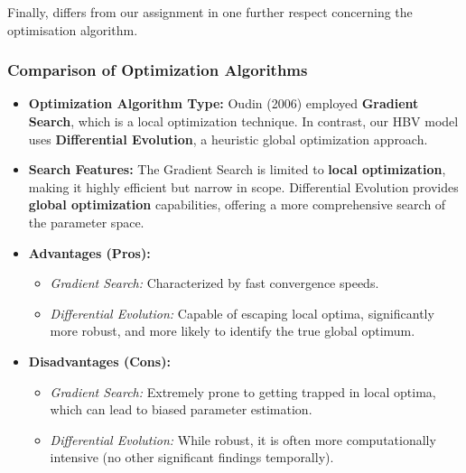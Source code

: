 Finally,\cite{Oudin.2006} differs from our assignment in one further respect concerning the optimisation algorithm.
\subsubsection*{Comparison of Optimization Algorithms}

\begin{itemize}
    \item \textbf{Optimization Algorithm Type:} 
    Oudin (2006) employed \textbf{Gradient Search}, which is a local optimization technique. In contrast, our HBV model uses \textbf{Differential Evolution}, a heuristic global optimization approach.
    
    \item \textbf{Search Features:}
    The Gradient Search is limited to \textbf{local optimization}, making it highly efficient but narrow in scope. Differential Evolution provides \textbf{global optimization} capabilities, offering a more comprehensive search of the parameter space.
    
    \item \textbf{Advantages (Pros):}
    \begin{itemize}
        \item \textit{Gradient Search:} Characterized by fast convergence speeds.
        \item \textit{Differential Evolution:} Capable of escaping local optima, significantly more robust, and more likely to identify the true global optimum.
    \end{itemize}
    
    \item \textbf{Disadvantages (Cons):}
    \begin{itemize}
        \item \textit{Gradient Search:} Extremely prone to getting trapped in local optima, which can lead to biased parameter estimation.
        \item \textit{Differential Evolution:} While robust, it is often more computationally intensive (no other significant findings temporally).
    \end{itemize}
\end{itemize}